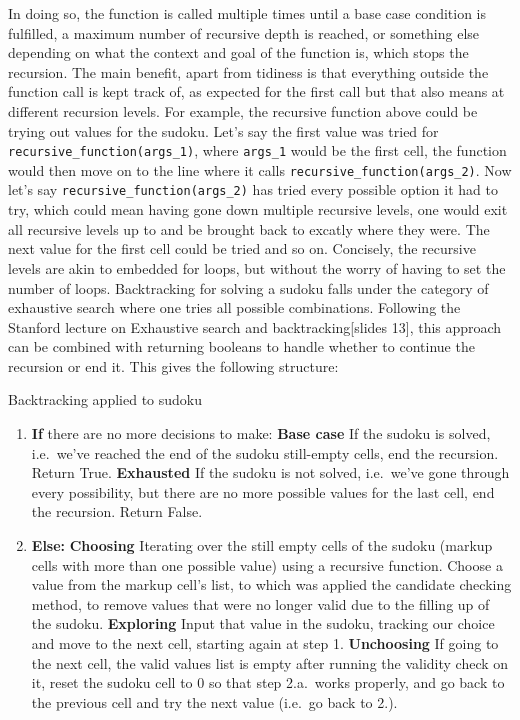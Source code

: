 \documentclass[12pt]{report} %
\begin{document}
In doing so, the function is called multiple times until a base case condition is fulfilled, a maximum number of recursive depth is reached\cite{stackoverflow_recursion_depth}, or something else depending on what the context and goal of the function is, which stops the recursion. The main benefit, apart from tidiness is that everything outside the function call is kept track of, as expected for the first call but that also means at different recursion levels. For example, the recursive function above could be trying out values for the sudoku. Let's say the first value was tried for \texttt{recursive\_function(args\_1)}, where \texttt{args\_1} would be the first cell, the function would then move on to the line where it calls \texttt{recursive\_function(args\_2)}. Now let's say \texttt{recursive\_function(args\_2)} has tried every possible option it had to try, which could mean having gone down multiple recursive levels, one would exit all recursive levels up to  and be brought back to excatly where they were. The next value for the first cell could be tried and so on. Concisely, the recursive levels are akin to embedded for loops, but without the worry of having to set the number of loops.
Backtracking for solving a sudoku falls under the category of exhaustive search where one tries all possible combinations. Following the Stanford lecture on Exhaustive search and backtracking[slides 13]\cite{stanford_lecture}, this approach can be combined with returning booleans to handle whether to continue the recursion or end it. This gives the following structure:

\begin{examplebox}{Backtracking applied to sudoku}

    \begin{enumerate}
      \item \textbf{If} there are no more decisions to make:
      \textbf{Base case} If the sudoku is solved, i.e.\ we've reached the end of the sudoku still-empty cells, end the recursion. Return True.
      \textbf{Exhausted} If the sudoku is not solved, i.e.\ we've gone through every possibility, but there are no more possible values for the last cell, end the recursion. Return False.
      \item \textbf{Else:}
       \textbf{Choosing} Iterating over the still empty cells of the sudoku (markup cells with more than one possible value) using a recursive function. Choose a value from the markup cell's list, to which was applied the candidate checking method, to remove values that were no longer valid due to the filling up of the sudoku.
       \textbf{Exploring} Input that value in the sudoku, tracking our choice and move to the next cell, starting again at step 1.
       \textbf{Unchoosing} If going to the next cell, the valid values list is empty after running the validity check on it, reset the sudoku cell to 0 so that step 2.a.\ works properly, and go back to the previous cell and try the next value (i.e.\ go back to 2.).

    \end{enumerate}

\end{examplebox}
\end{document}
